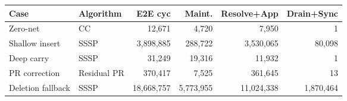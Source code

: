 \begin{tabular}{llrrrr}
\toprule
Case & Algorithm & E2E cyc & Maint. & Resolve+App & Drain+Sync \\
\midrule
Zero-net & CC & 12,671 & 4,720 & 7,950 & 1 \\
Shallow insert & SSSP & 3,898,885 & 288,722 & 3,530,065 & 80,098 \\
Deep carry & SSSP & 31,249 & 19,316 & 11,932 & 1 \\
PR correction & Residual PR & 370,417 & 7,525 & 361,645 & 13 \\
Deletion fallback & SSSP & 18,668,757 & 5,773,955 & 11,024,338 & 1,870,464 \\
\bottomrule
\end{tabular}
